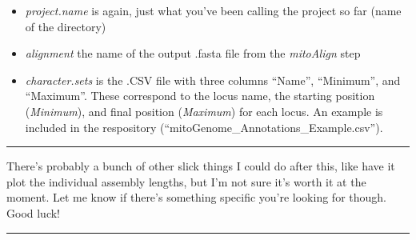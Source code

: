 \documentclass[]{article}
\providecommand{\tightlist}{%
  \setlength{\itemsep}{0pt}\setlength{\parskip}{0pt}}
\renewcommand{\linethickness}{0.05em}
\begin{document}
\begin{itemize}
\tightlist
\item
  \emph{project.name} is again, just what you've been calling the
  project so far (name of the directory)\\
\item
  \emph{alignment} the name of the output .fasta file from the
  \emph{mitoAlign} step\\
\item
  \emph{character.sets} is the .CSV file with three columns ``Name'',
  ``Minimum'', and ``Maximum''. These correspond to the locus name, the
  starting position (\emph{Minimum}), and final position
  (\emph{Maximum}) for each locus. An example is included in the
  respository (``mitoGenome\_Annotations\_Example.csv'').
\end{itemize}

\begin{center}\rule{0.5\linewidth}{\linethickness}\end{center}

There's probably a bunch of other slick things I could do after this,
like have it plot the individual assembly lengths, but I'm not sure it's
worth it at the moment. Let me know if there's something specific you're
looking for though.\\
Good luck!

\begin{center}\rule{0.5\linewidth}{\linethickness}\end{center}
\end{document}
